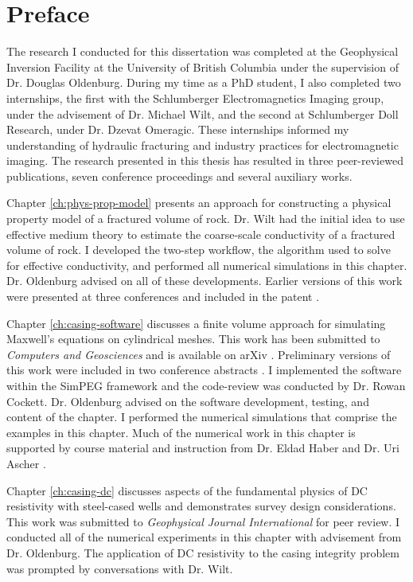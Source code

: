
\chapter{Preface}

The research I conducted for this dissertation was completed at the Geophysical Inversion Facility at the University of British Columbia under the supervision of Dr. Douglas Oldenburg. During my time as a PhD student, I also completed two internships, the first with the Schlumberger Electromagnetics Imaging group, under the advisement of Dr. Michael Wilt, and the second at Schlumberger Doll Research, under Dr. Dzevat Omeragic. These internships informed my understanding of hydraulic fracturing and industry practices for electromagnetic imaging. The research presented in this thesis has resulted in three peer-reviewed publications, seven conference proceedings and several auxiliary works.

Chapter \ref{ch:phys-prop-model} presents an approach for constructing a physical property
model of a fractured volume of rock. Dr. Wilt had the initial idea to use effective medium theory to estimate the coarse-scale conductivity of a fractured volume of rock. I developed the two-step workflow, the algorithm used to solve for effective conductivity, and performed all numerical simulations in this chapter. Dr. Oldenburg advised on all of these developments. Earlier versions of this work were presented at three conferences \citep{Heagy2013, Heagy2014, Wilt2014} and included in the patent \cite{Wilt2015}.

Chapter \ref{ch:casing-software} discusses a finite volume approach for simulating Maxwell’s equations on cylindrical meshes. This work has been submitted to \emph{Computers and Geosciences} and is available on arXiv \citep{Heagy2018a}. Preliminary versions of this work were included in two conference abstracts \citep{Heagy2015, Heagy2017a}. I implemented the software within the SimPEG framework and the code-review was conducted by Dr. Rowan Cockett. Dr. Oldenburg advised on the software development, testing, and content of the chapter. I performed the numerical simulations that comprise the examples in this chapter. Much of the numerical work in this chapter is supported by course material and instruction from Dr. Eldad Haber and Dr. Uri Ascher \citep{Haber2014, Ascher2008}.

Chapter \ref{ch:casing-dc} discusses aspects of the fundamental physics of DC resistivity with steel-cased wells and demonstrates survey design considerations. This work was submitted to \emph{Geophysical Journal International} for peer review. I conducted all of the numerical experiments in this chapter with advisement from Dr. Oldenburg. The application of DC resistivity to the casing integrity problem was prompted by conversations with Dr. Wilt.


